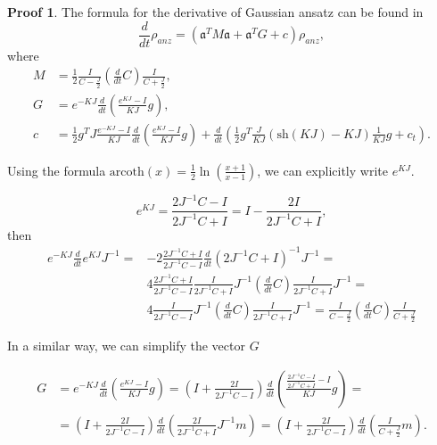 \documentclass[12pt]{article}
\theoremstyle{definition}
\newtheorem*{demo}{Proof}
\newcommand{\mf}[1]{\mathfrak{#1}}
\begin{document}
	\begin{demo}
		The formula for the derivative of Gaussian ansatz can be found in \cite{Dis}
		\begin{equation}
			\label{eq:DerWithLin}
			\frac{d}{dt}\rho_{anz} = (\mf{a}^TM\mf{a} + \mf{a}^TG + c)\rho_{anz},
		\end{equation}
		where
		\begin{align*}
			M &= \frac{1}{2}\frac{I}{C - \frac{J}{2}}\left(\frac{d}{dt}C\right)\frac{I}{C + \frac{J}{2}},\\
			G &= e^{-KJ}\frac{d}{dt}\left(\frac{e^{KJ} - I}{KJ}g\right),\\
			c &= \frac{1}{2}g^TJ\frac{e^{-KJ} - I}{KJ}\frac{d}{dt}\left( \frac{e^{KJ} - I}{KJ}g  \right) + \frac{d}{dt}\left(  \frac{1}{2}g^T\frac{J}{KJ}(\text{sh}(KJ) - KJ)\frac{1}{KJ}g  +c_t \right).
		\end{align*}
		
		
			Using the formula $\text{arcoth}(x) = \frac{1}{2}\ln\left(\frac{x + 1}{x - 1}\right)$, we can explicitly write $e^{KJ}$.
		
		\begin{equation*}
			e^{KJ} = \frac{2J^{-1}C - I}{2J^{-1}C + I} = I - \frac{2I}{2J^{-1}C + I},
		\end{equation*}
		then
		\begin{align*}
			e^{-KJ}\frac{d}{dt}e^{KJ}J^{-1} =& -2\frac{2J^{-1}C + I}{2J^{-1}C - I}\frac{d}{dt}(2J^{-1}C + I)^{-1}J^{-1} = \\
			&4 \frac{2J^{-1}C + I}{2J^{-1}C - I} \frac{I}{2J^{-1}C + I}J^{-1}\left(\frac{d}{dt}C\right)\frac{I}{2J^{-1}C + I}J^{-1} = \\
			& 4 \frac{I}{2J^{-1}C - I}J^{-1}\left(\frac{d}{dt}C\right)\frac{I}{2J^{-1}C + I}J^{-1} = \frac{I}{C - \frac{J}{2}}\left(\frac{d}{dt}C\right)\frac{I}{C + \frac{J}{2}}
		\end{align*}
		
		In a similar way, we can simplify the vector $G$
		
		\begin{align*}
			G &= e^{-KJ}\frac{d}{dt}\left(\frac{e^{KJ} - I}{KJ}g\right) = \left(  I + \frac{2I}{2J^{-1}C - I}  \right)\frac{d}{dt}\left( \frac{
				\frac{2J^{-1}C - I}{2J^{-1}C + I} - I}{KJ}   g  \right) =\nonumber\\
			& = \left(  I + \frac{2I}{2J^{-1}C - I}  \right)\frac{d}{dt}\left( \frac{2I}{2J^{-1}C + I} J^{-1}m  \right) = \left(  I + \frac{2I}{2J^{-1}C - I}  \right)\frac{d}{dt}\left(\frac{I}{C + \frac{J}{2}}m\right).
		\end{align*}
		

\end{demo}
\end{document}
